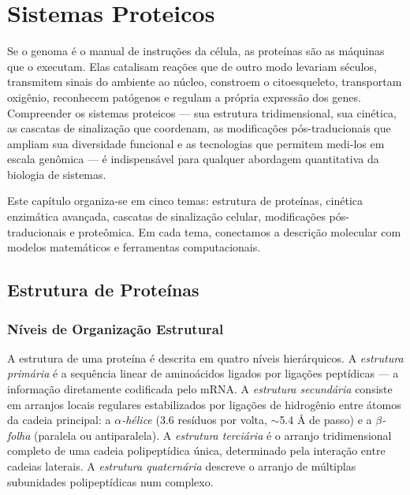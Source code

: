 \chapter{Sistemas Proteicos}
\label{cap:07}

Se o genoma é o manual de instruções da célula, as proteínas são as máquinas que o
executam. Elas catalisam reações que de outro modo levariam séculos, transmitem sinais
do ambiente ao núcleo, constroem o citoesqueleto, transportam oxigênio, reconhecem
patógenos e regulam a própria expressão dos genes. Compreender os sistemas proteicos ---
sua estrutura tridimensional, sua cinética, as cascatas de sinalização que coordenam,
as modificações pós-traducionais que ampliam sua diversidade funcional e as tecnologias
que permitem medi-los em escala genômica --- é indispensável para qualquer abordagem
quantitativa da biologia de sistemas.

Este capítulo organiza-se em cinco temas: estrutura de proteínas, cinética enzimática
avançada, cascatas de sinalização celular, modificações pós-traducionais e proteômica.
Em cada tema, conectamos a descrição molecular com modelos matemáticos e ferramentas
computacionais.

\section{Estrutura de Proteínas}

\subsection{Níveis de Organização Estrutural}

A estrutura de uma proteína é descrita em quatro níveis hierárquicos. A \emph{estrutura
primária} é a sequência linear de aminoácidos ligados por ligações peptídicas --- a
informação diretamente codificada pelo mRNA. A \emph{estrutura secundária} consiste em
arranjos locais regulares estabilizados por ligações de hidrogênio entre átomos da cadeia
principal: a \emph{$\alpha$-hélice} (3.6 resíduos por volta, $\sim$5.4 Å de passo) e a
\emph{$\beta$-folha} (paralela ou antiparalela). A \emph{estrutura terciária} é o arranjo
tridimensional completo de uma cadeia polipeptídica única, determinado pela interação entre
cadeias laterais. A \emph{estrutura quaternária} descreve o arranjo de múltiplas subunidades
polipeptídicas num complexo.

